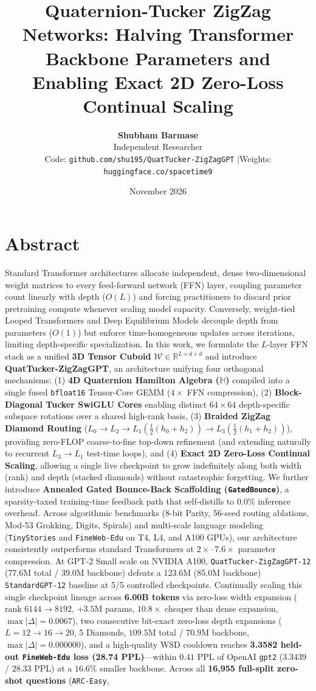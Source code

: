 \documentclass[10pt,twocolumn]{article}
\title{\textbf{Quaternion-Tucker ZigZag Networks: Halving Transformer Backbone Parameters and Enabling Exact 2D Zero-Loss Continual Scaling}}
\author{
    \textbf{Shubham Barmase} \\
    \small Independent Researcher \\
    \small Code: \texttt{github.com/shu195/QuatTucker-ZigZagGPT} \quad|\quad Weights: \texttt{huggingface.co/spacetime9}
}
\date{November 2026}
\begin{document}
\maketitle

\section*{Abstract}
\noindent Standard Transformer architectures allocate independent, dense two-dimensional weight matrices to every feed-forward network (FFN) layer, coupling parameter count linearly with depth ($O(L)$) and forcing practitioners to discard prior pretraining compute whenever scaling model capacity. Conversely, weight-tied Looped Transformers and Deep Equilibrium Models decouple depth from parameters ($O(1)$) but enforce time-homogeneous updates across iterations, limiting depth-specific specialization. In this work, we formulate the $L$-layer FFN stack as a unified \textbf{3D Tensor Cuboid} $\mathcal{W} \in \mathbb{R}^{L \times d \times d}$ and introduce \textbf{QuatTucker-ZigZagGPT}, an architecture unifying four orthogonal mechanisms: (1) \textbf{4D Quaternion Hamilton Algebra ($\mathbb{H}$)} compiled into a single fused \texttt{bfloat16} Tensor-Core GEMM ($4\times$ FFN compression), (2) \textbf{Block-Diagonal Tucker SwiGLU Cores} enabling distinct $64 \times 64$ depth-specific subspace rotations over a shared high-rank basis, (3) \textbf{Braided ZigZag Diamond Routing} ($L_0 \to L_2 \to L_1(\tfrac{1}{2}(h_0 + h_2)) \to L_3(\tfrac{1}{2}(h_1 + h_2))$), providing zero-FLOP coarse-to-fine top-down refinement (and extending naturally to recurrent $L_3 \to L_1$ test-time loops), and (4) \textbf{Exact 2D Zero-Loss Continual Scaling}, allowing a single live checkpoint to grow indefinitely along both width (rank) and depth (stacked diamonds) without catastrophic forgetting. We further introduce \textbf{Annealed Gated Bounce-Back Scaffolding (\texttt{GatedBounce})}, a sparsity-taxed training-time feedback path that self-distills to $0.0\%$ inference overhead. Across algorithmic benchmarks (8-bit Parity, 56-seed routing ablations, Mod-53 Grokking, Digits, Spirals) and multi-scale language modeling (\texttt{TinyStories} and \texttt{FineWeb-Edu} on T4, L4, and A100 GPUs), our architecture consistently outperforms standard Transformers at $2\times$--$7.6\times$ parameter compression. At GPT-2 Small scale on NVIDIA A100, \texttt{QuatTucker-ZigZagGPT-12} (77.6M total / 39.0M backbone) defeats a 123.6M (85.0M backbone) \texttt{StandardGPT-12} baseline at 5/5 controlled checkpoints. Continually scaling this single checkpoint lineage across \textbf{6.00B tokens} via zero-loss width expansion ($\text{rank } 6144 \to 8192$, $+3.5\text{M}$ params, $10.8\times$ cheaper than dense expansion, $\max|\Delta|=0.0067$), two consecutive bit-exact zero-loss depth expansions ($L = 12 \to 16 \to 20$, 5 Diamonds, $109.5\text{M}$ total / $70.9\text{M}$ backbone, $\max|\Delta|=0.000000$), and a high-quality WSD cooldown reaches \textbf{3.3582 held-out \texttt{FineWeb-Edu} loss (28.74 PPL)}---within $0.41$ PPL of OpenAI \texttt{gpt2} ($3.3439$ / $28.33$ PPL) at a $16.6\%$ smaller backbone. Across all \textbf{16,955 full-split zero-shot questions} (\texttt{ARC-Easy}, 
\end{document}
